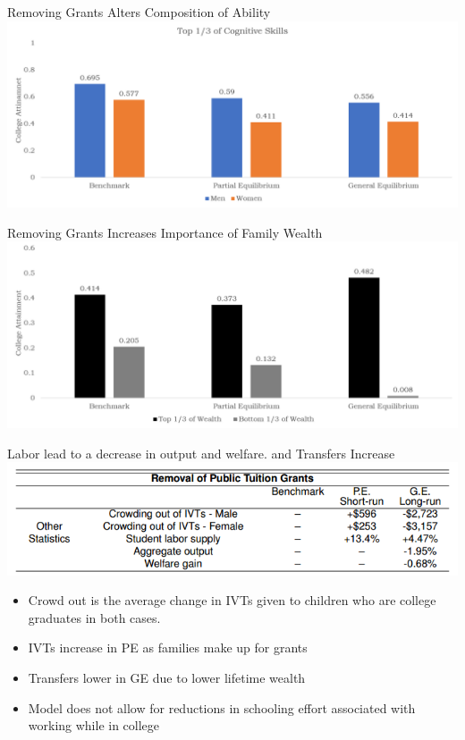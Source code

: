 \documentclass{beamer}
\begin{document}
\begin{frame}{Removing Grants Alters Composition of Ability}
\includegraphics[width=\textwidth]{grantsskill.png}
\end{frame}

\begin{frame}{Removing Grants Increases Importance of Family Wealth}
\includegraphics[width=\textwidth]{grantswealth.png}
\end{frame}

\begin{frame}{Labor lead to a decrease in output and welfare. and Transfers Increase}
\includegraphics[width=\textwidth]{removegrants.png}
\begin{itemize}
\item Crowd out is the average change in IVTs given to children who are college graduates in both cases. \\[2mm]
\item IVTs increase in PE as families make up for grants \\[2mm]
\item Transfers lower in GE due to lower lifetime wealth \\[2mm]
\item Model does not allow for reductions in schooling effort associated with working while in college
\end{itemize}
\end{frame}
\end{document}
